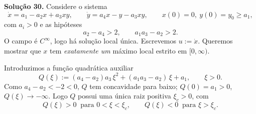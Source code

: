 \bigskip\noindent\textbf{Solução 30.}\quad
Considere o sistema
\[
\dot x=a_1-a_2x+a_3xy,\qquad \dot y=a_4x-y-a_3xy,\qquad x(0)=0,\ y(0)=y_0\ge a_1,
\]
com $a_i>0$ e as hipóteses
\begin{equation}\label{eq:hyp30}
a_2-a_4>2,\qquad a_1a_3-a_2>2 .
\end{equation}
O campo é $C^\infty$, logo há solução local única. Escrevemos $u:=\dot x$. Queremos mostrar que $x$ tem \emph{exatamente um} máximo local estrito em $[0,\infty)$.

Introduzimos a função quadrática auxiliar
\[
Q(\xi):=(a_4-a_2)a_3\,\xi^2+(a_1a_3-a_2)\,\xi+a_1 ,\qquad \xi>0 .
\]
Como $a_4-a_2<-2<0$, $Q$ tem concavidade para baixo; $Q(0)=a_1>0$, $Q(\xi)\to-\infty$. Logo $Q$ possui uma única raiz positiva $\xi_c>0$, com
\begin{equation}\label{eq:Qsign}
Q(\xi)>0\ \text{ para }0<\xi<\xi_c,\qquad Q(\xi)<0\ \text{ para }\xi>\xi_c .
\end{equation}


